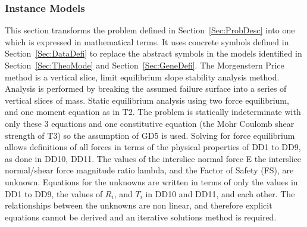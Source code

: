 \documentclass[12pt]{article}
\begin{document}
\subsubsection{Instance Models}
\label{Sec:InstMode}
This section transforms the problem defined in Section~\ref{Sec:ProbDesc} into one which is expressed in mathematical terms. It uses concrete symbols defined in Section~\ref{Sec:DataDefi} to replace the abstract symbols in the models identified in Section~\ref{Sec:TheoMode} and Section~\ref{Sec:GeneDefi}.
The Morgenstern Price method is a vertical slice, limit equilibrium slope stability analysis method. Analysis is performed by breaking the assumed failure surface into a series of vertical slices of mass. Static equilibrium analysis using two force equilibrium, and one moment equation as in T2. The problem is statically indeterminate with only these 3 equations and one constitutive equation (the Mohr Coulomb shear strength of T3) so the assumption of GD5 is used. Solving for force equilibrium allows definitions of all forces in terms of the physical properties of DD1 to DD9, as done in DD10, DD11.
The values of the interslice normal force E the interslice normal/shear force magnitude ratio lambda, and the Factor of Safety (FS), are unknown. Equations for the unknowns are written in terms of only the values in DD1 to DD9, the values of $R_{i}$, and $T_{i}$ in DD10 and DD11, and each other. The relationships between the unknowns are non linear, and therefore explicit equations cannot be derived and an iterative solutions method is required.
\end{document}
